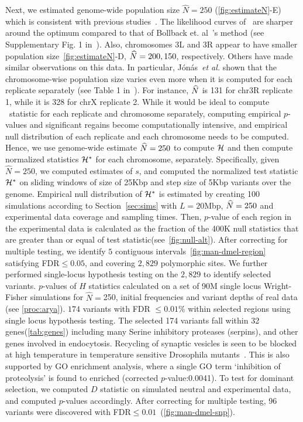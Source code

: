 Next, we estimated genome-wide population size $\hat{N}=250$
(\ref{fig:estimateN}-E) which is consistent with previous
studies~\cite{orozco2012adaptation,jonas2016estimating}. The
likelihood curves of \comale\ are sharper around the optimum compared
to that of Bollback et. al~\cite{bollback2008estimation}'s method (see
Supplementary Fig. 1 in~\cite{orozco2012adaptation}).  Also,
chromosomes 3L and 3R appear to have smaller population
size~\ref{fig:estimateN}-D, $\widehat{N}=200,150$, respectively. Others have
made similar observations on this data. In particular,
J\'{o}n\'{a}s~\emph{et al.} shown that the chromosome-wise population
size varies even more when it is computed for each replicate
separately (see Table 1 in~\cite{jonas2016estimating}). For instance,
$\widehat{N}$ is 131 for chr3R replicate 1, while it is 328 for chrX replicate
2.  While it would be ideal to compute \comale\ statistic for each
replicate and chromosome separately, computing empirical $p$-values
and significant regains become computationally intensive, and
empirical null distribution of each replicate and each chromosome
needs to be computed.  Hence, we use genome-wide estimate $\widehat{N}=250$ to
compute ${\cal H}$ and then compute normalized statistics ${\cal H}^*$ for each
chromosome, separately.  Specifically, given $\hat{N}=250$, we
computed estimates of $s$, and computed the normalized test statistic
${\cal H}^*$ on sliding windows of size of 25Kbp and step size of 5Kbp
variants over the genome.  Empirical null distribution of ${\cal H}^*$ is
estimated by creating 100 simulations according to
Section~\ref{sec:sims} with $L=20$Mbp, $\widehat{N}=250$ and experimental data
coverage and sampling times.  Then, $p$-value of each region in the
experimental data is calculated as the fraction of the 400K null
statistics that are greater than or equal of test
statistic(see~\ref{fig:null-alt}).  After correcting for multiple
testing, we identify $5$ contiguous
intervals~\ref{fig:man-dmel-region} satisfying FDR$\le0.05$, and
covering $2,829$ polymorphic sites. We further performed single-locus
hypothesis testing on the $2,829$ to identify selected variants.
$p$-values of $H$ statistics calculated on a set of 90M single locus
Wright-Fisher simulations for $\widehat{N}=$250, initial frequencies
and variant depths of real data (see \ref{proc:arya}).  $174$ variants
with FDR $\le0.01$\% within selected regions using single locus
hypothesis testing.  The selected 174 variants fall within 32
genes(\ref{tab:genes}) including many Serine inhibitory proteases
(serpins), and other genes involved in endocytosis. Recycling of
synaptic vesicles is seen to be blocked at high temperature in
temperature sensitive Drosophila
mutants~\cite{kosaka1983reversible}. This is also supported by GO
enrichment analysis, where a single GO term `inhibition of
proteolysis' is found to enriched (corrected $p$-value:0.0041).  To
test for dominant selection, we computed $D$ statistic on simulated
neutral and experimental data, and computed $p$-values accordingly.
After correcting for multiple testing, 96 variants were discovered
with FDR$\le 0.01$~(\ref{fig:man-dmel-snp}).

